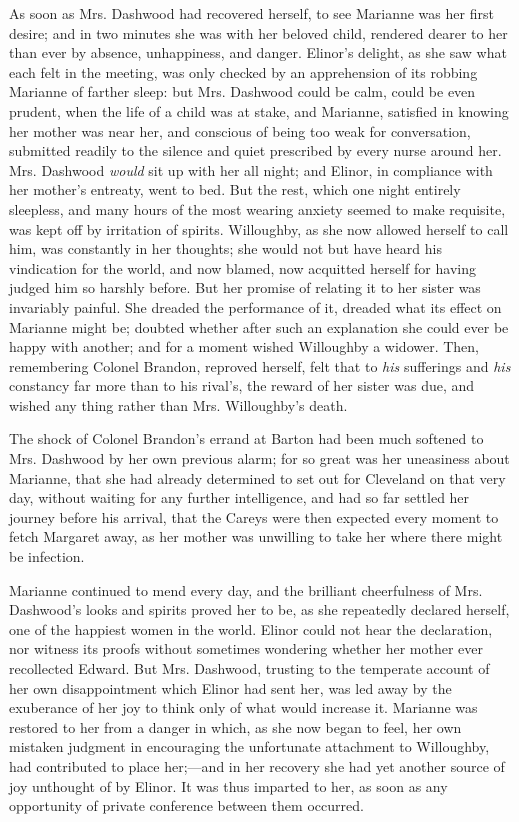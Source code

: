 As soon as Mrs. Dashwood had recovered herself, to see Marianne was her first desire; and in two minutes she was with her beloved child, rendered dearer to her than ever by absence, unhappiness, and danger. Elinor's delight, as she saw what each felt in the meeting, was only checked by an apprehension of its robbing Marianne of farther sleep: but Mrs. Dashwood could be calm, could be even prudent, when the life of a child was at stake, and Marianne, satisfied in knowing her mother was near her, and conscious of being too weak for conversation, submitted readily to the silence and quiet prescribed by every nurse around her. Mrs. Dashwood {\em would} sit up with her all night; and Elinor, in compliance with her mother's entreaty, went to bed. But the rest, which one night entirely sleepless, and many hours of the most wearing anxiety seemed to make requisite, was kept off by irritation of spirits. Willoughby,  as she now allowed herself to call him, was constantly in her thoughts; she would not but have heard his vindication for the world, and now blamed, now acquitted herself for having judged him so harshly before. But her promise of relating it to her sister was invariably painful. She dreaded the performance of it, dreaded what its effect on Marianne might be; doubted whether after such an explanation she could ever be happy with another; and for a moment wished Willoughby a widower. Then, remembering Colonel Brandon, reproved herself, felt that to {\em his} sufferings and {\em his} constancy far more than to his rival's, the reward of her sister was due, and wished any thing rather than Mrs. Willoughby's death.

The shock of Colonel Brandon's errand at Barton had been much softened to Mrs. Dashwood by her own previous alarm; for so great was her uneasiness about Marianne, that she had already determined to set out for Cleveland on that very day, without waiting for any further intelligence, and had so far settled her journey before his arrival, that the Careys were then expected every moment to fetch Margaret away, as her mother was unwilling to take her where there might be infection.

Marianne continued to mend every day, and the brilliant cheerfulness of Mrs. Dashwood's looks and spirits proved her to be, as she repeatedly declared herself, one of the happiest women in the world. Elinor could not hear the declaration, nor witness its proofs without sometimes wondering whether her mother ever recollected Edward. But Mrs. Dashwood, trusting to the temperate account of her own disappointment which Elinor had sent her, was led away by the exuberance of her joy to think only of what would increase it. Marianne was restored to her from a danger in which, as she now began to feel, her own mistaken judgment in encouraging the unfortunate attachment to Willoughby, had contributed to place her;---and in her recovery she had yet another source of joy unthought of by Elinor. It was thus imparted to her, as soon as any opportunity of private conference between them occurred.

